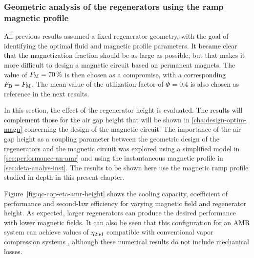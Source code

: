 \documentclass[referee]{svjour3}
\begin{document}
\subsubsection{Geometric analysis of the regenerators using the ramp magnetic profile}
\label{sec:geom-analys-regen}

\textcolor{black}{All} previous results assumed a fixed regenerator geometry, with the goal of identifying the optimal fluid and magnetic profile parameters. \textcolor{black}{It became clear that the} magnetization fraction should be as large as possible, but that makes it more difficult to design a magnetic circuit \textcolor{black}{based on} permanent magnets. The value of $F_{\mathrm{M}} = \SI{70}{\percent}$ is then chosen as a compromise, with \textcolor{black}{a corresponding} $F_{\mathrm{B}} = F_{\mathrm{M}}$. The mean value of \textcolor{black}{the} utilization factor of $\Phi = 0.4$ is also chosen as reference in the next results.

In this section, the \textcolor{black}{effect of the} regenerator height is \textcolor{black}{evaluated. The results will complement those for the} air gap height that will be shown in \autoref{cha:design-optim-magn} concerning the design of the magnetic circuit. The importance of the air gap height as a coupling \textcolor{black}{parameter} between the geometric design of the regenerators and the magnetic circuit was explored using a simplified model in \autoref{sec:performance-an-amr} and using the instantaneous magnetic profile in \autoref{sec:deta-analys-inst}. The results \textcolor{black}{to be} shown \textcolor{black}{here} use the magnetic \textcolor{black}{ramp} profile \textcolor{black}{studied in depth in} this present chapter.

Figure~\ref{fig:qc-cop-eta-amr-height} shows the cooling capacity, coefficient of performance and second-law efficiency for varying magnetic field and regenerator height. \textcolor{black}{As} expected, larger regenerators can \textcolor{black}{produce} the desired performance with lower magnetic fields. It can also be seen that this configuration for an AMR system can achieve values of $\eta_{\mathrm{2nd}}$ compatible with conventional vapor compression systems \cite{HERMES20081341,NEGRAO20113051}, although these numerical results do not include mechanical losses.
\end{document}
